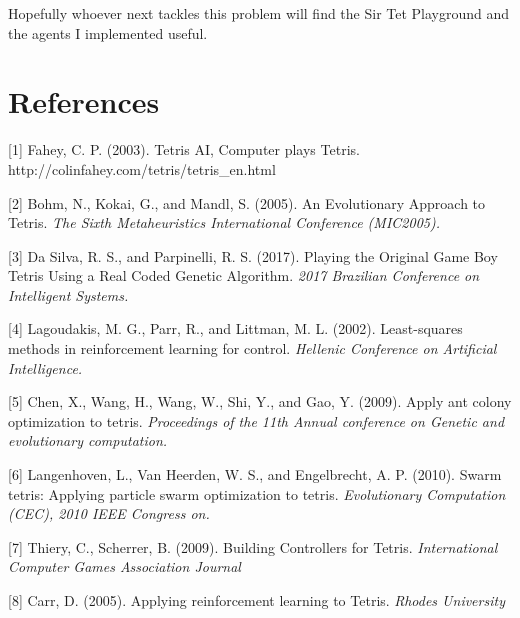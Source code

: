 \documentclass[11pt]{article}
\begin{document}
Hopefully whoever next tackles this problem will find the Sir Tet
Playground and the agents I implemented useful.

    \hypertarget{references}{%
\section{References}\label{references}}

{[}1{]} Fahey, C. P. (2003). Tetris AI, Computer plays Tetris.
http://colinfahey.com/tetris/tetris\_en.html

{[}2{]} Bohm, N., Kokai, G., and Mandl, S. (2005). An Evolutionary
Approach to Tetris. \emph{The Sixth Metaheuristics International
Conference (MIC2005).}

{[}3{]} Da Silva, R. S., and Parpinelli, R. S. (2017). Playing the
Original Game Boy Tetris Using a Real Coded Genetic Algorithm.
\emph{2017 Brazilian Conference on Intelligent Systems.}

{[}4{]} Lagoudakis, M. G., Parr, R., and Littman, M. L. (2002).
Least-squares methods in reinforcement learning for control.
\emph{Hellenic Conference on Artificial Intelligence.}

{[}5{]} Chen, X., Wang, H., Wang, W., Shi, Y., and Gao, Y. (2009). Apply
ant colony optimization to tetris. \emph{Proceedings of the 11th Annual
conference on Genetic and evolutionary computation.}

{[}6{]} Langenhoven, L., Van Heerden, W. S., and Engelbrecht, A. P.
(2010). Swarm tetris: Applying particle swarm optimization to tetris.
\emph{Evolutionary Computation (CEC), 2010 IEEE Congress on.}

{[}7{]} Thiery, C., Scherrer, B. (2009). Building Controllers for
Tetris. \emph{International Computer Games Association Journal}

{[}8{]} Carr, D. (2005). Applying reinforcement learning to Tetris.
\emph{Rhodes University}


    
    
    
\end{document}
